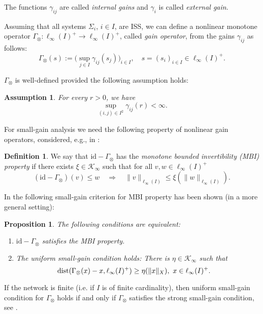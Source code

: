 \documentclass[twocolumn]{IEEEtran} %
\newtheorem{assumption}{Assumption}
\newtheorem{proposition}[theorem]{Proposition}
\theoremstyle{definition}
\newtheorem{definition}[theorem]{Definition}
\newcommand{\Kinf}{\mathcal{K_\infty}}%
\newcommand{\id}{\mathrm{id}}%
\newcommand{\dist}{\mathrm{dist}}%
\begin{document}
The functions $\gamma_{ij}$ are called \emph{internal gains} and $\gamma_i$ is called \emph{external gain}.

Assuming that all systems $\Sigma_i$, $i\in I$, are ISS, we can define a nonlinear monotone operator $\Gamma_{\otimes}:\ell_{\infty}(I)^+ \rightarrow \ell_{\infty}(I)^+$, called \emph{gain operator}, from the gains $\gamma_{ij}$ as follows:%
\begin{equation}
\label{eq:Gain-operator-semimax}
  \Gamma_{\otimes}(s) := \bigl(\sup_{j\in I}\gamma_{ij}(s_j)\bigr)_{i\in I},\quad s = (s_i)_{i\in I} \in \ell_{\infty}(I)^+.%
\end{equation}

$\Gamma_{\otimes}$ is well-defined provided the following assumption holds:
\begin{assumption}\label{ass_gammamax_welldef}
For every $r>0$, we have%
\begin{equation*}
  \sup_{(i,j) \in I^2}\gamma_{ij}(r) < \infty.
\end{equation*}
\end{assumption}

For small-gain analysis we need the following property of nonlinear gain operators, considered, e.g., in \cite{DRW07,MKG20}:
\begin{definition}
We say that $\id - \Gamma_{\otimes}$ has the \emph{monotone bounded invertibility (MBI) property} if there exists $\xi \in \Kinf$ such that for all $v,w \in \ell_{\infty}(I)^+$
\begin{equation*}
  (\id - \Gamma_{\otimes})(v) \leq w \quad \Rightarrow \quad \|v\|_{\ell_{\infty}(I)} \leq \xi(\|w\|_{\ell_{\infty}(I)}).%
\end{equation*}
\end{definition}

In \cite{MKG20} the following small-gain criterion for MBI property has been shown (in a more general setting):
\begin{proposition}\label{prop:criteria-MBI-without-unit}
The following conditions are equivalent:
\begin{enumerate}[label=(\roman*)]
\item\label{itm:MBI-criterion-without-unit-1} $\id - \Gamma_{\otimes}$ satisfies the MBI property.
\item\label{itm:MBI-criterion-without-unit-2} The \emph{uniform small-gain condition} holds: There is $\eta \in \Kinf$ such that
\begin{equation}
\label{eq:uSGC-dist-form}
  \hspace{-4mm}\dist(\Gamma_{\otimes}(x) - x,\ell_{\infty}(I)^+) \geq \eta(\|x\|_X), \ x \in \ell_{\infty}(I)^+.%
\end{equation}
\end{enumerate}
\end{proposition}
If the network is finite (i.e. if $I$ is of finite cardinality), then uniform small-gain condition for $\Gamma_\otimes$ holds if and only if $\Gamma_\otimes$ satisfies the strong small-gain condition, see \cite[Proposition 14]{MKG20}.
\end{document}
